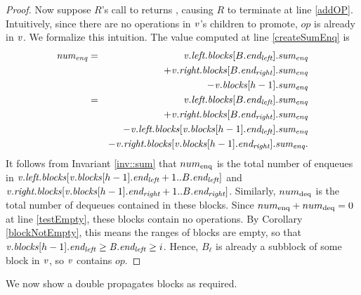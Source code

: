 \begin{proof}
Now suppose $R$'s call to  returns \nl, causing $R$ to terminate at line \ref{addOP}.
Intuitively, since there are no operations in $\var{v}$'s children to promote, $op$ is already in $\var{v}$.
We formalize this intuition.
The value computed at line \ref{createSumEnq} is
\begin{eqnarray*}
\var{num\sub{enq}}
&=&  \var{v}.\fld{left.blocks}[B.\eleft].\fld{sum\sub{enq}} \\
&& + \var{v}.\fld{right.blocks}[B.\eright].\fld{sum\sub{enq}}\\
&&  - \var{v}.\fld{blocks}[h-1].\fld{sum\sub{enq}} \\
&=& \var{v}.\fld{left.blocks}[B.\eleft].\fld{sum\sub{enq}}\\
&& + \var{v}.\fld{right.blocks}[B.\eright].\fld{sum\sub{enq}} \\
&&- \var{v}.\fld{left.blocks}[\var{v}.\fld{blocks}[h-1].\eleft].\fld{sum\sub{enq}} \\
&& - \var{v}.\fld{right.blocks}[\var{v}.\fld{blocks}[h-1].\eright].\fld{sum\sub{enq}}.
\end{eqnarray*}
It follows from Invariant \ref{inv::sum} that $num\sub{enq}$ is the total  number of enqueues  in 
$\var{v}.\fld{left.blocks}[\var{v}.\fld{blocks}[h-1].\eleft+1..B.\eleft]$ and
$\var{v}.\fld{right.blocks}[\var{v}.\fld{blocks}[h-1].\eright+1..B.\eright]$.
Similarly, $num\sub{deq}$ is the total number of dequeues contained in these blocks.
Since $num\sub{enq}+num\sub{deq}=0$ at line \ref{testEmpty},
these blocks contain no operations.
By Corollary \ref{blockNotEmpty}, this means the ranges of blocks are empty, so that $\var{v}.\fld{blocks}[h-1].\eleft \geq \var{B}.\eleft \geq i$.
Hence, $B_\ell$ is already a subblock of some block in $\var{v}$, so $\var{v}$ contains $op$.
\end{proof}

We now show  a double  propagates blocks as required.


